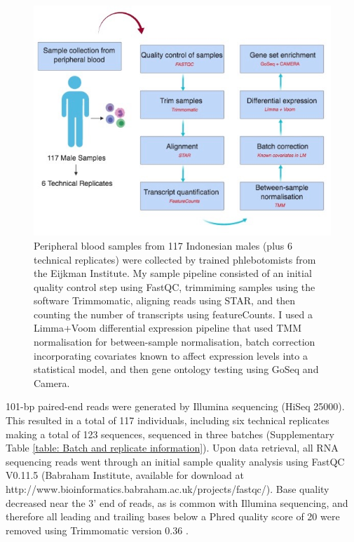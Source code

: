 \documentclass[12pt,a4paper,titlepage,twoside,openright]{book}
\begin{document}
\begin{mainmatter}
{{\begin{figure}[htb!]
\centering
\includegraphics[width=\textwidth,height=\textheight,keepaspectratio]{Figures/SamplePipeline.jpg}
\caption{Peripheral blood samples from 117 Indonesian males (plus 6 technical replicates) were collected by trained phlebotomists from the Eijkman Institute. My sample pipeline consisted of an initial quality control step using FastQC, trimmiming samples using the software Trimmomatic, aligning reads using STAR, and then counting the number of transcripts using featureCounts. I used a Limma+Voom differential expression pipeline that used TMM normalisation for between-sample normalisation, batch correction incorporating covariates known to affect expression levels into a statistical model, and then gene ontology testing using GoSeq and Camera.}
\label{fig:Study Pipeline}
\end{figure}

101-bp paired-end reads were generated by Illumina sequencing (HiSeq 25000). This resulted in a total of 117 individuals, including six technical replicates making a total of 123 sequences, sequenced in three batches (Supplementary Table \ref{table: Batch and replicate information}). Upon data retrieval, all RNA sequencing reads went through an initial sample quality analysis using FastQC V0.11.5 (Babraham Institute, available for download at http://www.bioinformatics.babraham.ac.uk/projects/fastqc/). Base quality decreased near the 3’ end of reads, as is common with Illumina sequencing, and therefore all leading and trailing bases below a Phred quality score of 20 were removed using Trimmomatic version 0.36 \cite{bolger2014trimmomatic}.

}}
\end{mainmatter}
\end{document}
